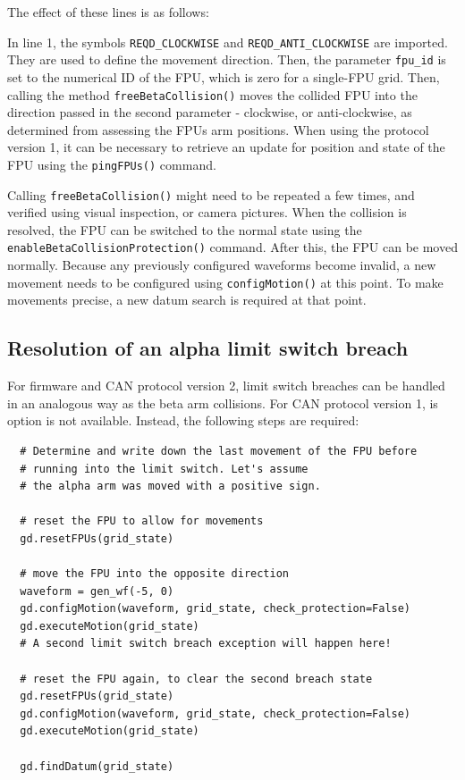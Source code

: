 \documentclass[11pt,a4paper]{report}
\begin{document}
The effect of these lines is as follows:

In line 1, the symbols \texttt{REQD\_CLOCKWISE} and
\texttt{REQD\_ANTI\_CLOCKWISE} are imported. They are used to define
the movement direction. Then, the parameter \texttt{fpu\_id} is set to
the numerical ID of the FPU, which is zero for a single-FPU
grid. Then, calling the method \texttt{freeBetaCollision()} moves the
collided FPU into the direction passed in the second parameter -
clockwise, or anti-clockwise, as determined from assessing the FPUs
arm positions. When using the protocol version 1, it can be necessary
to retrieve an update for position and state of the FPU using the
\texttt{pingFPUs()} command.

Calling \texttt{freeBetaCollision()} might need to be repeated a few
times, and verified using visual inspection, or camera pictures. When
the collision is resolved, the FPU can be switched to the normal state
using the \texttt{enableBetaCollisionProtection()} command.  After
this, the FPU can be moved normally. Because any previously configured
waveforms become invalid, a new movement needs to be configured using
\texttt{configMotion()} at this point. To make movements precise, a
new datum search is required at that point.

\subsection{Resolution of an alpha limit switch breach}
For firmware and CAN protocol  version 2, limit switch
breaches can be handled in an analogous way as the
beta arm collisions. For CAN protocol version 1,
is option is not available. Instead, the following
steps are required:

\begin{verbatim}
  # Determine and write down the last movement of the FPU before
  # running into the limit switch. Let's assume
  # the alpha arm was moved with a positive sign.

  # reset the FPU to allow for movements
  gd.resetFPUs(grid_state)

  # move the FPU into the opposite direction
  waveform = gen_wf(-5, 0)
  gd.configMotion(waveform, grid_state, check_protection=False)
  gd.executeMotion(grid_state)
  # A second limit switch breach exception will happen here!

  # reset the FPU again, to clear the second breach state
  gd.resetFPUs(grid_state)
  gd.configMotion(waveform, grid_state, check_protection=False)
  gd.executeMotion(grid_state)

  gd.findDatum(grid_state)
  
\end{verbatim}
  
\end{document}
